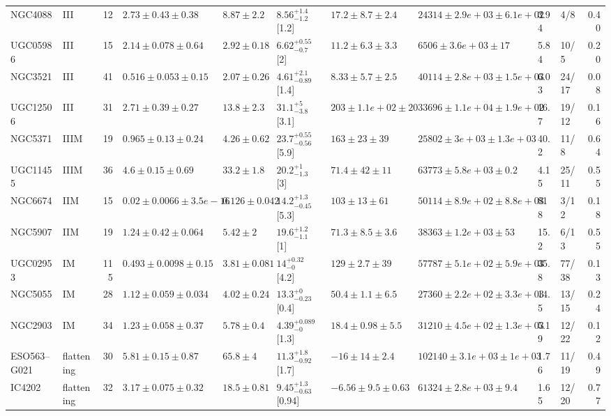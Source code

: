\documentclass[10pt]{article}
\begin{document}
\begin{landscape}
{\begin{longtable}{llrlllllllr}
NGC4088 & III & 12 & $2.73\pm0.43\pm0.38$ & $8.87\pm2.2$ & $8.56^{+1.4}_{-1.2}$ [1.2] & $17.2\pm8.7\pm2.4$ & $24314\pm2.9e+03\pm6.1e+02$ & 3.94 & 4/8 & 0.40\\
UGC05986 & III & 15 & $2.14\pm0.078\pm0.64$ & $2.92\pm0.18$ & $6.62^{+0.55}_{-0.7}$ [2] & $11.2\pm6.3\pm3.3$ & $6506\pm3.6e+03\pm17$ & 5.84 & 10/5 & 0.20\\
NGC3521 & III & 41 & $0.516\pm0.053\pm0.15$ & $2.07\pm0.26$ & $4.61^{+2.1}_{-0.89}$ [1.4] & $8.33\pm5.7\pm2.5$ & $40114\pm2.8e+03\pm1.5e+03$ & 6.03 & 24/17 & 0.08\\
UGC12506 & III & 31 & $2.71\pm0.39\pm0.27$ & $13.8\pm2.3$ & $31.1^{+5}_{-3.8}$ [3.1] & $203\pm1.1e+02\pm20$ & $33696\pm1.1e+04\pm1.9e+02$ & 16.7 & 19/12 & 0.16\\
NGC5371 & IIIM & 19 & $0.965\pm0.13\pm0.24$ & $4.26\pm0.62$ & $23.7^{+0.55}_{-0.56}$ [5.9] & $163\pm23\pm39$ & $25802\pm3e+03\pm1.3e+03$ & 40.2 & 11/8 & 0.64\\
UGC11455 & IIIM & 36 & $4.6\pm0.15\pm0.69$ & $33.2\pm1.8$ & $20.2^{+1}_{-1.3}$ [3] & $71.4\pm42\pm11$ & $63773\pm5.8e+03\pm0.2$ & 4.15 & 25/11 & 0.55\\
NGC6674 & IIM & 15 & $0.02\pm0.0066\pm3.5e-16$ & $0.126\pm0.042$ & $14.2^{+1.3}_{-0.45}$ [5.3] & $103\pm13\pm61$ & $50114\pm8.9e+02\pm8.8e+03$ & 818 & 3/12 & 0.18\\
NGC5907 & IIM & 19 & $1.24\pm0.42\pm0.064$ & $5.42\pm2$ & $19.6^{+1.2}_{-1.1}$ [1] & $71.3\pm8.5\pm3.6$ & $38363\pm1.2e+03\pm53$ & 15.2 & 6/13 & 0.55\\
UGC02953 & IM & 115 & $0.493\pm0.0098\pm0.15$ & $3.81\pm0.081$ & $14^{+0.32}_{-0}$ [4.2] & $129\pm2.7\pm39$ & $57787\pm5.1e+02\pm5.9e+03$ & 35.8 & 77/38 & 0.13\\
NGC5055 & IM & 28 & $1.12\pm0.059\pm0.034$ & $4.02\pm0.24$ & $13.3^{+0}_{-0.23}$ [0.4] & $50.4\pm1.1\pm6.5$ & $27360\pm2.2e+02\pm3.3e+03$ & 14.5 & 13/15 & 0.24\\
NGC2903 & IM & 34 & $1.23\pm0.058\pm0.37$ & $5.78\pm0.4$ & $4.39^{+0.089}_{-0}$ [1.3] & $18.4\pm0.98\pm5.5$ & $31210\pm4.5e+02\pm1.3e+03$ & 5.19 & 12/22 & 0.12\\
ESO563--G021 & flattening & 30 & $5.81\pm0.15\pm0.87$ & $65.8\pm4$ & $11.3^{+1.8}_{-0.92}$ [1.7] & $-16\pm14\pm2.4$ & $102140\pm3.1e+03\pm1e+03$ & 1.76 & 11/19 & 0.49\\
IC4202 & flattening & 32 & $3.17\pm0.075\pm0.32$ & $18.5\pm0.81$ & $9.45^{+1.3}_{-0.63}$ [0.94] & $-6.56\pm9.5\pm0.63$ & $61324\pm2.8e+03\pm9.4$ & 1.65 & 12/20 & 0.77\\

\end{longtable}}
\end{landscape}
\end{document}
